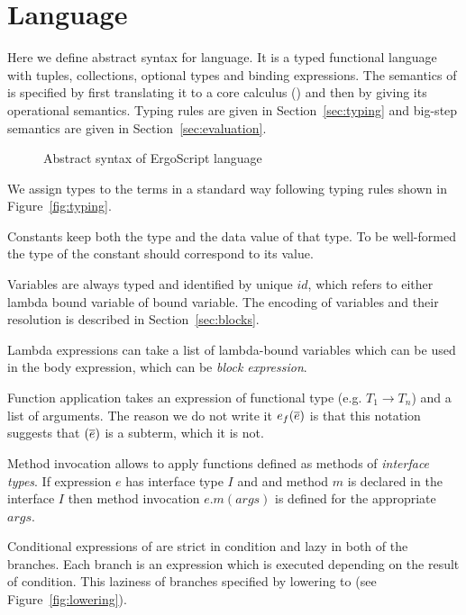 \section{Language}
\label{sec:language}

Here we define abstract syntax for \langname language. It is a typed
functional language with tuples, collections, optional types and 
binding expressions. The semantics of \langname is specified by first
translating it to a core calculus (\corelang) and then by giving its
operational semantics. Typing rules are given in Section~\ref{sec:typing} and
big-step semantics are given in Section~\ref{sec:evaluation}.

\begin{figure}[h]
    \footnotesize
    
    \caption{Abstract syntax of ErgoScript language}
    \label{fig:language}
\end{figure}
    
We assign types to the terms in a standard way following typing rules shown
in Figure~\ref{fig:typing}.

Constants keep both the type and the data value of that type. To be
well-formed the type of the constant should correspond to its value.

Variables are always typed and identified by unique $id$, which refers to
either lambda bound variable of  bound variable. The encoding of
variables and their resolution is described in Section~\ref{sec:blocks}.

Lambda expressions can take a list of lambda-bound variables which can be
used in the body expression, which can be \emph{block expression}. 

Function application takes an expression of functional type (e.g. $T_1 \to
T_n$) and a list of arguments. The reason we do not write it $e_f(\overline{e})$
is that this notation suggests that $(\overline{e})$ is a subterm, which it is not.

Method invocation allows to apply functions defined as methods of
\emph{interface types}. If expression $e$ has interface type $I$ and and
method $m$ is declared in the interface $I$ then method invocation
$e.m(args)$ is defined for the appropriate $args$.

Conditional expressions of \langname are strict in condition and lazy in both
of the branches. Each branch is an expression which is executed depending on
the result of condition. This laziness of branches specified by lowering to
\corelang (see Figure~\ref{fig:lowering}).

